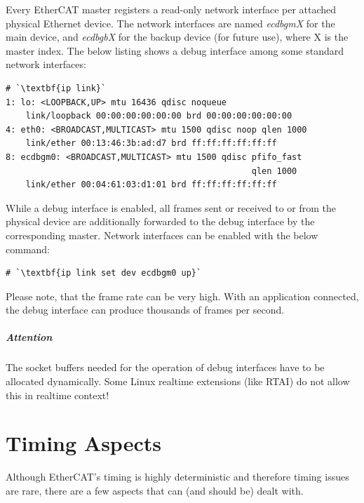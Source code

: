 \documentclass[a4paper,12pt,BCOR6mm,bibtotoc,idxtotoc]{scrbook}
\begin{document}
Every EtherCAT master registers a read-only network interface per attached
physical Ethernet device. The network interfaces are named \textit{ecdbgmX}
for the main device, and \textit{ecdbgbX} for the backup device (for future
use), where X is the master index. The below listing shows a debug interface
among some standard network interfaces:

\begin{lstlisting}
# `\textbf{ip link}`
1: lo: <LOOPBACK,UP> mtu 16436 qdisc noqueue
    link/loopback 00:00:00:00:00:00 brd 00:00:00:00:00:00
4: eth0: <BROADCAST,MULTICAST> mtu 1500 qdisc noop qlen 1000
    link/ether 00:13:46:3b:ad:d7 brd ff:ff:ff:ff:ff:ff
8: ecdbgm0: <BROADCAST,MULTICAST> mtu 1500 qdisc pfifo_fast
                                                 qlen 1000
    link/ether 00:04:61:03:d1:01 brd ff:ff:ff:ff:ff:ff
\end{lstlisting}

While a debug interface is enabled, all frames sent or received to or from the
physical device are additionally forwarded to the debug interface by the
corresponding master. Network interfaces can be enabled with the below
command:

\begin{lstlisting}
# `\textbf{ip link set dev ecdbgm0 up}`
\end{lstlisting}

Please note, that the frame rate can be very high. With an application
connected, the debug interface can produce thousands of frames per second.

\paragraph{Attention} The socket buffers needed for the operation of debug
interfaces have to be allocated dynamically. Some Linux realtime extensions
(like RTAI) do not allow this in realtime context!


\chapter{Timing Aspects}
\label{sec:timing}

Although EtherCAT's timing is highly deterministic and therefore timing issues
are rare, there are a few aspects that can (and should be) dealt with.

\end{document}
